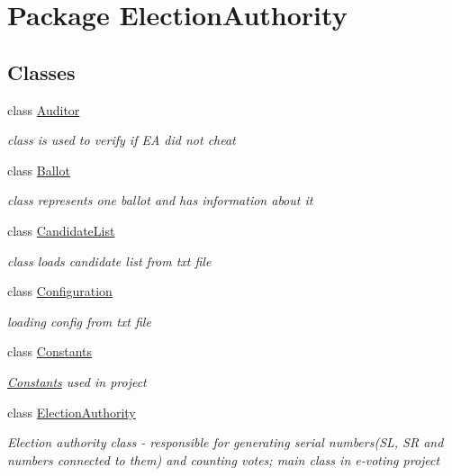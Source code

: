 \hypertarget{namespace_election_authority}{}\section{Package Election\+Authority}
\label{namespace_election_authority}
\subsection*{Classes}
\begin{DoxyCompactItemize}
\item 
class \hyperlink{class_election_authority_1_1_auditor}{Auditor}
\begin{DoxyCompactList}\small\item\em class is used to verify if E\+A did not cheat \end{DoxyCompactList}\item 
class \hyperlink{class_election_authority_1_1_ballot}{Ballot}
\begin{DoxyCompactList}\small\item\em class represents one ballot and has information about it \end{DoxyCompactList}\item 
class \hyperlink{class_election_authority_1_1_candidate_list}{Candidate\+List}
\begin{DoxyCompactList}\small\item\em class loads candidate list from txt file \end{DoxyCompactList}\item 
class \hyperlink{class_election_authority_1_1_configuration}{Configuration}
\begin{DoxyCompactList}\small\item\em loading config from txt file \end{DoxyCompactList}\item 
class \hyperlink{class_election_authority_1_1_constants}{Constants}
\begin{DoxyCompactList}\small\item\em \hyperlink{class_election_authority_1_1_constants}{Constants} used in project \end{DoxyCompactList}\item 
class \hyperlink{class_election_authority_1_1_election_authority}{Election\+Authority}
\begin{DoxyCompactList}\small\item\em Election authority class -\/ responsible for generating serial numbers(\+S\+L, S\+R and numbers connected to them) and counting votes; main class in e-\/voting project \end{DoxyCompactList}\item 

\end{DoxyCompactItemize}

